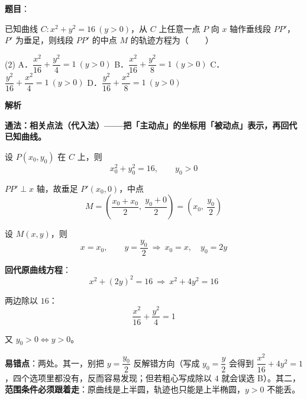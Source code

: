 \begin{answer}

\textbf{题目}：

已知曲线 $C:x^{2}+y^{2}=16\ (y>0)$，从 $C$ 上任意一点 $P$ 向 $x$ 轴作垂线段 $PP'$，$P'$ 为垂足，则线段 $PP'$ 的中点 $M$ 的轨迹方程为\mbox{（　　）}

\begin{gkopts}(2)
\task A．$\dfrac{x^{2}}{16}+\dfrac{y^{2}}4=1\ (y>0)$
\task B．$\dfrac{x^{2}}{16}+\dfrac{y^{2}}8=1\ (y>0)$
\task C．$\dfrac{y^{2}}{16}+\dfrac{x^{2}}4=1\ (y>0)$
\task D．$\dfrac{y^{2}}{16}+\dfrac{x^{2}}8=1\ (y>0)$
\end{gkopts}

\textbf{解析}

\textbf{通法：相关点法（代入法）——把「主动点」的坐标用「被动点」表示，再回代已知曲线。}

设 $P\left(x_0,y_0\right)$ 在 $C$ 上，则
\nopagebreak[4]
\[x_0^{2}+y_0^{2}=16,\qquad y_0>0\]

$PP'\perp x$ 轴，故垂足 $P'\left(x_0,0\right)$，中点
\nopagebreak[4]
\[M=\left(\frac{x_0+x_0}2,\ \frac{y_0+0}2\right)=\left(x_0,\ \frac{y_0}2\right)\]

设 $M(x,y)$，则
\nopagebreak[4]
\[x=x_0,\qquad y=\frac{y_0}2\ \Longrightarrow\ x_0=x,\quad y_0=2y\]

\textbf{回代原曲线方程}：
\nopagebreak[4]
\[x^{2}+(2y)^{2}=16\ \Longrightarrow\ x^{2}+4y^{2}=16\]

两边除以 $16$：
\nopagebreak[4]
\[\frac{x^{2}}{16}+\frac{y^{2}}4=1\]

又 $y_0>0\iff y>0$。

\begin{gktip}
\textbf{易错点}：两处。其一，别把 $y=\dfrac{y_0}2$ 反解错方向（写成 $y_0=\dfrac y2$ 会得到 $\dfrac{x^2}{16}+4y^2=1$，四个选项里都没有，反而容易发现；但若粗心写成除以 $4$ 就会误选 B）。其二，\textbf{范围条件必须跟着走}：原曲线是上半圆，轨迹也只能是上半椭圆，$y>0$ 不能丢。
\end{gktip}


\par\medskip

\end{answer}
